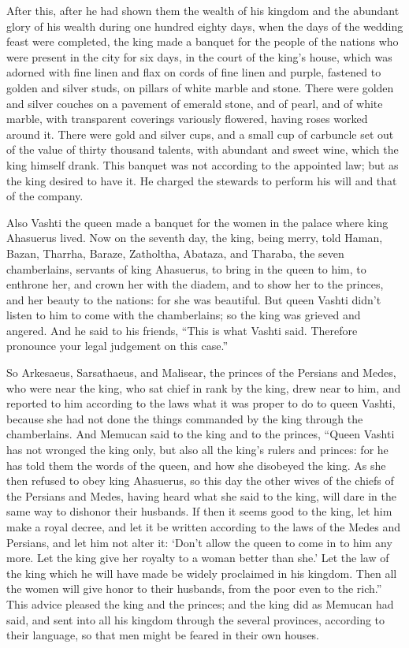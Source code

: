 {After this, after he had shown them the wealth of his kingdom and the abundant glory of his wealth during one hundred eighty days,
when the days of the wedding feast were completed, the king made a banquet for the people of the nations who were present in the city for six days, in the court of the king’s house,
which was adorned with fine linen and flax on cords of fine linen and purple, fastened to golden and silver studs, on pillars of white marble and stone. There were golden and silver couches on a pavement of emerald stone, and of pearl, and of white marble, with transparent coverings variously flowered, having roses worked around it.
There were gold and silver cups, and a small cup of carbuncle set out of the value of thirty thousand talents, with abundant and sweet wine, which the king himself drank.
This banquet was not according to the appointed law; but as the king desired to have it. He charged the stewards to perform his will and that of the company.
\par }{\PP {}Also Vashti the queen made a banquet for the women in the palace where king Ahasuerus lived.
Now on the seventh day, the king, being merry, told Haman, Bazan, Tharrha, Baraze, Zatholtha, Abataza, and Tharaba, the seven chamberlains, servants of king Ahasuerus,
to bring in the queen to him, to
 enthrone her, and crown her with the diadem, and to show her to the princes, and her beauty to the nations: for she was beautiful.
But queen Vashti didn’t listen to him to come with the chamberlains; so the king was grieved and angered.
And he said to his friends, “This is what Vashti said. Therefore pronounce your legal judgement on this case.”
\par }{\PP {}So Arkesaeus, Sarsathaeus, and Malisear, the princes of the Persians and Medes, who were near the king, who sat chief in rank by the king, drew near to him,
and reported to him according to the laws what it was proper to do to queen Vashti, because she had not done the things commanded by the king through the chamberlains.
And Memucan said to the king and to the princes, “Queen Vashti has not wronged the king only, but also all the king’s rulers and princes:
for he has told them the words of the queen, and how she
 disobeyed the king. As she then refused to obey king Ahasuerus,
so this day the other wives of the chiefs of the Persians and Medes, having heard what she said to the king, will dare in the same way to dishonor their husbands.
If then it seems good to the king, let him make a royal decree, and let it be written according to the laws of the Medes and Persians, and let him not alter it: ‘Don’t allow the queen to come in to him any more. Let the king give her royalty to a woman better than she.’
Let the law of the king which he will have made be widely proclaimed in his kingdom. Then all the women will give honor to their husbands, from the poor even to the rich.”
This advice pleased the king and the princes; and the king did as Memucan had said,
and sent into all his kingdom through the several provinces, according to their language, so that men might be feared in their own houses.

}
